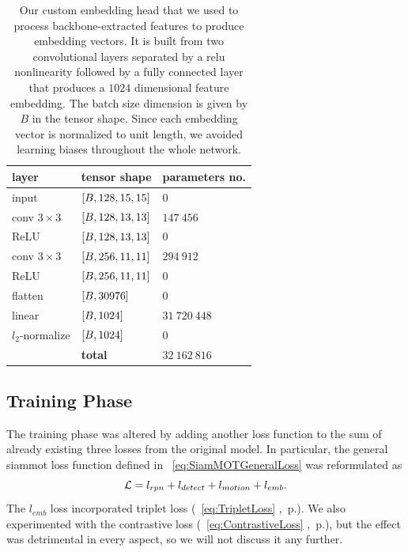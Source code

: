 \begin{table}[!t]
    \centering
    \begin{tabular}{lll}
        \toprule
        \textbf{layer}    & \textbf{tensor shape}        & \textbf{parameters no.} \\
        \midrule
        input             & $\left[ {B, 128, 15, 15} \right]$ & $0$                     \\
        \midrule
        conv $3 \times 3$ & $\left[ {B, 128, 13, 13} \right]$ & $147\ 456$              \\
        ReLU              & $\left[ {B, 128, 13, 13} \right]$ & $0$                     \\
        \midrule
        conv $3 \times 3$ & $\left[ {B, 256, 11, 11} \right]$ & $294\ 912$              \\
        ReLU              & $\left[ {B, 256, 11, 11} \right]$ & $0$                     \\
        \midrule
        flatten           & $\left[ {B, 30976} \right]$       & $0$                     \\
        linear            & $\left[ {B, 1024} \right]$        & $31\ 720\ 448$          \\
        \midrule
        $l_2$-normalize   & $\left[ {B, 1024} \right]$        & $0$                     \\
        \bottomrule
                          & \textbf{total}               & $32\ 162\ 816$          \\
        \cline{2-3}
    \end{tabular}
    \caption[Feature embedding head]{Our custom embedding head that we used to process backbone-extracted features to produce embedding vectors. It is built from two convolutional layers separated by a \gls{relu} nonlinearity followed by a fully connected layer that produces a $1024$ dimensional feature embedding. The batch size dimension is given by $B$ in the tensor shape. Since each embedding vector is normalized to unit length, we avoided learning biases throughout the whole network.}
    \label{tab:FeatureEmbeddingHead}
\end{table}

\subsection{Training Phase}

The training phase was altered by adding another loss function to the sum of already existing three losses from the original model. In particular, the general \gls{siammot} loss function defined in \eqtext{}~\ref{eq:SiamMOTGeneralLoss} was reformulated as
\begin{equation}
    \label{eq:SiamMOTFeatureEmbLoss}
    \mathcal{L} = l_{rpn} + l_{detect} + l_{motion} + l_{emb}.
\end{equation}
The $l_{emb}$ loss incorporated triplet loss (\eqtext{}~\ref{eq:TripletLoss} ,~p.\pageref{eq:TripletLoss}). We also experimented with the contrastive loss (\eqtext{}~\ref{eq:ContrastiveLoss} ,~p.\pageref{eq:ContrastiveLoss}), but the effect was detrimental in every aspect, so we will not discuss it any further.

